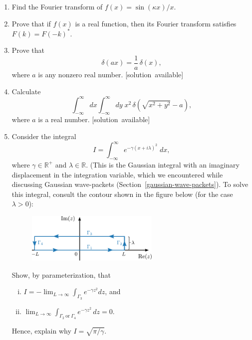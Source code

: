 \documentclass[10pt,a4paper]{article}
\begin{document}
\begin{enumerate}
\item
  Find the Fourier transform of $f(x) = \sin(\kappa x)/x.$

\item
  Prove that if $f(x)$ is a real function, then its Fourier transform
  satisfies $F(k) = F(-k)^*$.

\item
  Prove that
  \begin{equation}
    \delta(ax) = \frac{1}{a}\,\delta(x),
  \end{equation}
  where $a$ is any nonzero real number.
  \hfill{\scriptsize [solution~available]}

\item Calculate
  \begin{equation}
    \int_{-\infty}^\infty dx \int_{-\infty}^\infty dy \;
    x^2\, \delta\left(\sqrt{x^2+y^2}-a\right),
  \end{equation}
  where $a$ is a real number.
  \hfill{\scriptsize [solution~available]}
  
\item
  Consider the integral $$I = \int_{-\infty}^\infty e^{-\gamma\left(x
    + i\lambda\right)^2} \; dx,$$ where $\gamma \in \mathbb{R}^+$ and
  $\lambda \in \mathbb{R}.$ (This is the Gaussian integral with an
  imaginary displacement in the integration variable, which we
  encountered while discussing Gaussian wave-packets
  (Section~\ref{gaussian-wave-packets}).  To solve this integral,
  consult the contour shown in the figure below (for the case $\lambda
  > 0$):

  \begin{figure}[ht]
    \centering\includegraphics[width=0.6\textwidth]{rectangular_contour}
  \end{figure}

  Show, by parameterization, that
  \begin{enumerate}[(i)]
  \item $\displaystyle I = - \lim_{L\rightarrow \infty} \int_{\Gamma_3} e^{-\gamma
    z^2} dz$, and
  \item $\displaystyle \lim_{L\rightarrow \infty} \int_{\Gamma_2~\text{or}~\Gamma_4}
  e^{-\gamma z^2}\, dz = 0.$
  \end{enumerate}
  Hence, explain why $I = \sqrt{\pi/\gamma}.$

\end{enumerate}
    
\end{document}
